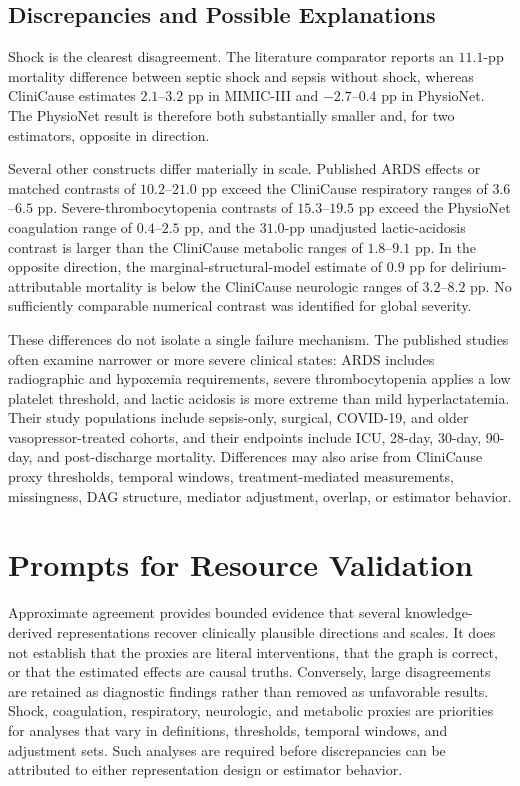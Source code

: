 \documentclass[letterpaper,10pt]{article}
\begin{document}
\subsection{Discrepancies and Possible Explanations}

Shock is the clearest disagreement.  The literature comparator reports an
\(11.1\)-pp mortality difference between septic shock and sepsis without shock,
whereas CliniCause estimates \(2.1\)--\(3.2\) pp in MIMIC-III and
\(-2.7\)--\(0.4\) pp in PhysioNet.  The PhysioNet result is therefore both
substantially smaller and, for two estimators, opposite in direction.

Several other constructs differ materially in scale.  Published ARDS effects
or matched contrasts of \(10.2\)--\(21.0\) pp exceed the CliniCause respiratory
ranges of \(3.6\)--\(6.5\) pp.  Severe-thrombocytopenia contrasts of
\(15.3\)--\(19.5\) pp exceed the PhysioNet coagulation range of
\(0.4\)--\(2.5\) pp, and the \(31.0\)-pp unadjusted lactic-acidosis contrast is
larger than the CliniCause metabolic ranges of \(1.8\)--\(9.1\) pp.  In the
opposite direction, the marginal-structural-model estimate of \(0.9\) pp for
delirium-attributable mortality is below the CliniCause neurologic ranges of
\(3.2\)--\(8.2\) pp.  No sufficiently comparable numerical contrast was
identified for global severity.

These differences do not isolate a single failure mechanism.  The published
studies often examine narrower or more severe clinical states: ARDS includes
radiographic and hypoxemia requirements, severe thrombocytopenia applies a low
platelet threshold, and lactic acidosis is more extreme than mild
hyperlactatemia.  Their study populations include sepsis-only, surgical,
COVID-19, and older vasopressor-treated cohorts, and their endpoints include
ICU, 28-day, 30-day, 90-day, and post-discharge mortality.  Differences may
also arise from CliniCause proxy thresholds, temporal windows,
treatment-mediated measurements, missingness, DAG structure, mediator
adjustment, overlap, or estimator behavior.

\section{Prompts for Resource Validation}

Approximate agreement provides bounded evidence that several knowledge-derived
representations recover clinically plausible directions and scales.  It does
not establish that the proxies are literal interventions, that the graph is
correct, or that the estimated effects are causal truths.  Conversely, large
disagreements are retained as diagnostic findings rather than removed as
unfavorable results.  Shock, coagulation, respiratory, neurologic, and
metabolic proxies are priorities for analyses that vary in definitions,
thresholds, temporal windows, and adjustment sets.  Such analyses are required
before discrepancies can be attributed to either representation design or
estimator behavior.
\end{document}
